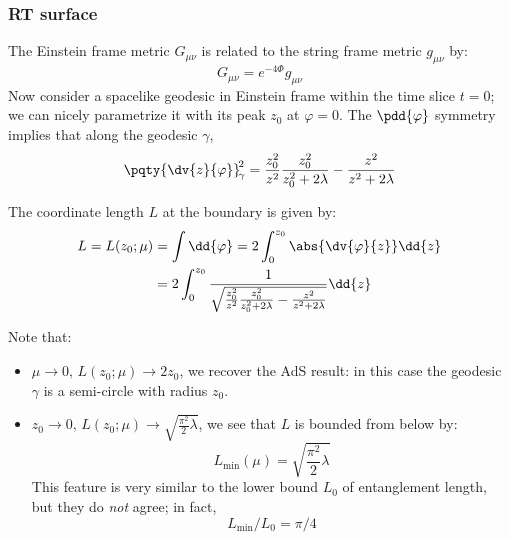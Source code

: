 \documentclass[a4paper
	,10pt
]{article}
\begin{document}
\subsubsection{RT surface}
	The Einstein frame metric $G_{\mu\nu}$ is related to the string frame metric $g_{\mu\nu}$ by:
	\begin{equation}
		G_{\mu\nu} = e^{-4\Phi} g_{\mu\nu}
	\end{equation}
	Now consider a spacelike geodesic in Einstein frame within the time slice $t = 0$; we can nicely parametrize it  with its peak $z_0$ at $\varphi = 0$. The $\pdd{\varphi}$ symmetry implies that along the geodesic $\gamma$,
	\begin{equation}
		\pqty{\dv{z}{\varphi}}_{\!\gamma}^{\!2}
		= \frac{z_0^2}{z^2}
				\frac{z_0^2}{z_0^2 + 2\lambda}
			- \frac{z^2}{z^2 + 2\lambda}
	\end{equation}
	
	The coordinate length $L$ at the boundary is given by:
	\begin{equation}
	\begin{aligned}
	  L = L(z_0;\mu)
	  &= \int \dd{\varphi}
	  = 2\int_0^{z_0}
	      \abs{\dv{\varphi}{z}}
	      \dd{z} \\
	  &= 2\int_0^{z_0}
	      \frac{1}{\sqrt{
	          \frac{z_0^2}{z^2}
	          \frac{z_0^2}{z_0^2 + 2\lambda}
	          - \frac{z^2}{z^2 + 2\lambda}
	      }}
	      \dd{z}
	\end{aligned}
	\label{eq:length_function}
	\end{equation}
	
\pagebreak\noindent
	Note that:
	\begin{itemize}
	\item $\mu\to 0,\, L(z_0;\mu) \to 2z_0$, we recover the AdS result: in this case the geodesic $\gamma$ is a semi-circle with radius $z_0$.
	
	\item $z_0\to 0,\,
		L(z_0;\mu) \to \sqrt{\frac{\pi^2}{2} \lambda}
	$, we see that $L$ is bounded from below by:
	\begin{equation}
		L_{\min} (\mu)
		= \sqrt{\frac{\pi^2}{2} \lambda}
	\end{equation}
	This feature is very similar to the lower bound $L_0$ of entanglement length, but they do \textit{not} agree; in fact,
	\begin{equation}
		L_{\min} / L_0 = \pi / 4
	\end{equation}
	\end{itemize}
	
\end{document}
